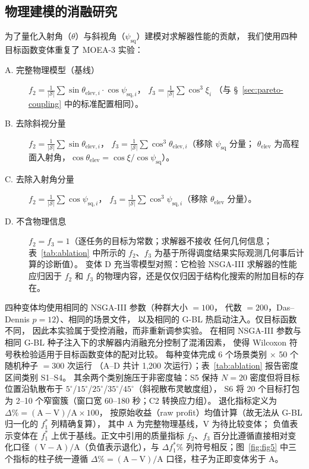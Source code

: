 \subsection{物理建模的消融研究}
\label{sec:ablation}

为了量化入射角（$\theta$）与斜视角（${\psi_{\text{sq}}}$）建模对求解器性能的贡献，
我们使用四种目标函数变体重复了 MOEA-3 实验：
%
\begin{description}
\item[A. 完整物理模型（基线）] $f_2 = \frac{1}{|\mathcal{S}|}\sum \sin\theta_{\text{elev},i} \cdot \cos\psi_{\text{sq},i}$，
      $f_3 = \frac{1}{|\mathcal{S}|}\sum \cos^3\xi_i$
      （与 \S~\ref{sec:pareto-coupling} 中的标准配置相同）。
\item[B. 去除斜视分量] $f_2 = \frac{1}{|\mathcal{S}|}\sum \sin\theta_{\text{elev},i}$，
      $f_3 = \frac{1}{|\mathcal{S}|}\sum \cos^3\theta_{\text{elev},i}$（移除 ${\psi_{\text{sq}}}$ 分量；
      $\theta_{\text{elev}}$ 为高程面入射角，$\cos\theta_{\text{elev}}=\cos\xi/\cos\psi_{\text{sq}}$）。
\item[C. 去除入射角分量] $f_2 = \frac{1}{|\mathcal{S}|}\sum \cos\psi_{\text{sq},i}$，
      $f_3 = \frac{1}{|\mathcal{S}|}\sum \cos^3\psi_{\text{sq},i}$（移除 $\theta_{\text{elev}}$ 分量）。
\item[D. 不含物理信息] $f_2 = f_3 = 1$（逐任务的目标为常数；求解器不接收
      任何几何信息；表~\ref{tab:ablation} 中所示的 $f_2$、$f_3$
      为基于所得调度结果实际观测几何事后计算的诊断值）。
      变体 D 充当零模型对照：它检验 NSGA-III 求解器的性能应归因于 $f_2$ 和 $f_3$
      的物理内容，还是仅仅归因于结构化搜索的附加目标的存在。
\end{description}
%
四种变体均使用相同的 NSGA-III 参数（种群大小 $= 100$，
代数 $= 200$，Das--Dennis $p=12$）、相同的场景文件，
以及相同的 G-BL 热启动注入。仅目标函数不同，
因此本实验属于受控消融，而非重新调参实验。
在相同 NSGA-III 参数与相同 G-BL 种子注入下的求解器内消融充分控制了混淆因素，
使得 Wilcoxon 符号秩检验适用于目标函数变体的配对比较。
每种变体完成 6 个场景类别 $\times$ 50 个随机种子 $= 300$ 次运行
（A--D 共计 1,200 次运行）；表~\ref{tab:ablation} 报告密度区间类别 S1--S4。
其余两个类别施压于非密度轴：S5 保持 $N=20$ 密度但将目标位置沿轨散布于
$5^\circ$/$15^\circ$/$25^\circ$/$35^\circ$/$45^\circ$（斜视散布灵敏度组），
S6 将 20 个目标打包为 2--10 个窄窗簇（窗口宽 60--180 秒；C2 转换应力组）。
退化指标定义为
$\Delta\% = (\text{A} - \text{V})/\text{A} \times 100$，
按原始收益（raw profit）均值计算（故无法从 G-BL 归一化的 $f_1^*$ 列精确复算），
其中 A 为完整物理基线，V 为待比较变体；
负值表示变体在 $f_1^*$ 上优于基线。正文中引用的质量指标 $f_2$、$f_3$ 百分比遵循直接相对变化口径 $(\text{V}-\text{A})/\text{A}$（负值表示退化），与 $\Delta f_1^*\%$ 列符号相反；图~\ref{fig:fig5} 中三个指标的柱子统一遵循 $\Delta\%=(\text{A}-\text{V})/\text{A}$ 口径，柱子为正即变体劣于 A。

